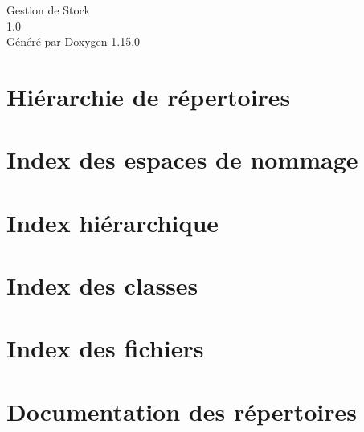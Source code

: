 \documentclass[twoside]{book}
\newcommand{\+}{\discretionary{\mbox{\scriptsize$\hookleftarrow$}}{}{}}
\newcommand{\clearemptydoublepage}{%
    \newpage{\pagestyle{empty}\cleardoublepage}%
  }
\begin{document}
  \raggedbottom
    \hypersetup{pageanchor=false,
                bookmarksnumbered=true,
                pdfencoding=unicode
               }
  \begin{titlepage}
  \vspace*{7cm}
  \begin{center}%
  {\Large Gestion de Stock}\\
  [1ex]\large 1.\+0 \\
  \vspace*{1cm}
  {\large Généré par Doxygen 1.15.0}\\
  \end{center}
  \end{titlepage}
  \clearemptydoublepage
  \tableofcontents
  \clearemptydoublepage
  \hypersetup{pageanchor=true}
\chapter{Hiérarchie de répertoires}

\chapter{Index des espaces de nommage}

\chapter{Index hiérarchique}

\chapter{Index des classes}

\chapter{Index des fichiers}

\chapter{Documentation des répertoires}










\end{document}
